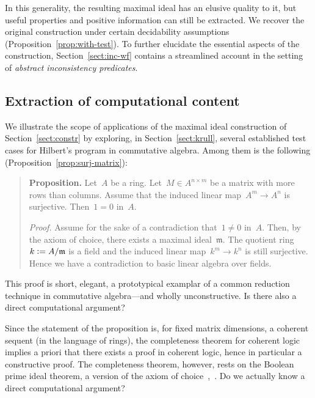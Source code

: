\documentclass[com,11pt,crcready]{iosart2x}
\theoremstyle{definition}
\theoremstyle{plain}
\theoremstyle{remark}
\newcommand{\?}{\,{:}\,}
\newcommand{\mmm}{\mathfrak{m}}
\newcommand{\defeq}{\vcentcolon=}
\renewcommand{\_}{\mathpunct{.}\,}
\begin{document}
In this generality, the resulting
maximal ideal has an elusive quality to it, but useful properties and positive information can still be
extracted. We recover the original construction under certain
decidability assumptions (Proposition~\ref{prop:with-test}). To further
elucidate the essential aspects of the construction, Section~\ref{sect:inc-wf}
contains a streamlined account in the setting of \emph{abstract inconsistency
predicates}.


\subsection*{Extraction of computational content} We illustrate the scope of
applications of the maximal ideal construction of Section~\ref{sect:constr} by
exploring, in Section~\ref{sect:krull}, several established test cases for
Hilbert's program in commutative algebra. Among them is the following
(Proposition~\ref{prop:surj-matrix}):
\begin{quote}\small
\textbf{Proposition.} Let~$A$ be a ring. Let~$M \in A^{n \times m}$ be a matrix with more rows
than columns. Assume that the induced linear map~$A^m \to A^n$ is surjective.
Then~$1 = 0$ in~$A$.
\smallskip

\emph{Proof.} Assume for the sake of a contradiction that~$1 \neq 0$ in~$A$.
Then, by the axiom of choice, there exists a maximal ideal~$\mmm$. The quotient
ring~$k \defeq A/\mmm$ is a field and the induced linear map~$k^m \to k^n$ is
still surjective. Hence we have a contradiction to basic linear algebra over fields.
\end{quote}
This proof is short, elegant, a prototypical examplar of a common reduction
technique in commutative algebra---and wholly unconstructive. Is there also a
direct computational argument?

Since the statement of the proposition is, for fixed matrix dimensions, a
coherent sequent (in the language of rings), the completeness
theorem for coherent logic~\cite[Corollary~D1.5.10]{johnstone:elephant} implies a priori that there exists a proof in
coherent logic, hence in particular a constructive proof. The completeness
theorem, however, rests on the Boolean prime ideal theorem, a version of the
axiom of choice~\cite[Remark~D1.5.11]{johnstone:elephant},~\cite{scott:prime,henkin:metamath,banaschewski:ultrafilter}. Do we actually know a direct computational argument?
\end{document}
